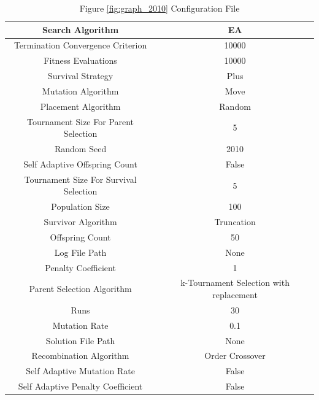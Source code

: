 \documentclass{standalone}
\begin{document}
\begin{table}[!htb]
	\centering
	\caption{Figure \ref{fig:graph_2010} Configuration File}
	\label{tab:graph_2010}
	\begin{tabular}{| c | c |}
		\hline
		Search Algorithm		& EA		 \\
		\hline
		Termination Convergence Criterion		& 10000		 \\
		\hline
		Fitness Evaluations		& 10000		 \\
		\hline
		Survival Strategy		& Plus		 \\
		\hline
		Mutation Algorithm		& Move		 \\
		\hline
		Placement Algorithm		& Random		 \\
		\hline
		Tournament Size For Parent Selection		& 5		 \\
		\hline
		Random Seed		& 2010		 \\
		\hline
		Self Adaptive Offspring Count		& False		 \\
		\hline
		Tournament Size For Survival Selection		& 5		 \\
		\hline
		Population Size		& 100		 \\
		\hline
		Survivor Algorithm		& Truncation		 \\
		\hline
		Offspring Count		& 50		 \\
		\hline
		Log File Path		& None		 \\
		\hline
		Penalty Coefficient		& 1		 \\
		\hline
		Parent Selection Algorithm		& k-Tournament Selection with replacement		 \\
		\hline
		Runs		& 30		 \\
		\hline
		Mutation Rate		& 0.1		 \\
		\hline
		Solution File Path		& None		 \\
		\hline
		Recombination Algorithm		& Order Crossover		 \\
		\hline
		Self Adaptive Mutation Rate		& False		 \\
		\hline
		Self Adaptive Penalty Coefficient		& False		 \\
		\hline
	\end{tabular}
\end{table}
\end{document}
